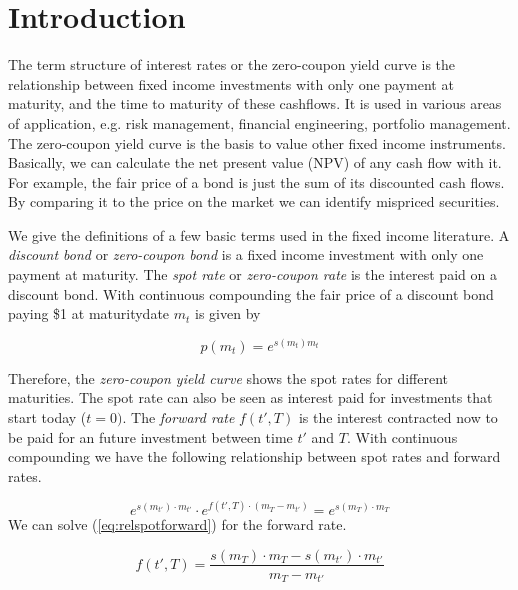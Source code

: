 \newpage
\section{Introduction}


The term structure of interest rates or the zero-coupon yield curve is the relationship between fixed income investments with only one payment at maturity, and the time to maturity of these cashflows. It is used in various areas of application, e.g. risk management, financial engineering, portfolio management. The zero-coupon yield curve is the basis to value other fixed income instruments. Basically, we can calculate the net present value (NPV) of any cash flow with it. For example, the fair price of a bond is just the sum of its discounted cash flows. By comparing it to the price on the market we can identify mispriced securities.

We give the definitions of a few basic terms used in the fixed income literature. A \emph{discount bond} or \emph{zero-coupon bond} is a fixed income investment with only one payment at maturity. The \emph{spot rate} or \emph{zero-coupon rate} is the interest paid on a discount bond. With continuous compounding the fair price of a discount bond paying \$1 at maturitydate  $m_t$ is given by

\begin{equation}
  \label{eq:pricediscountbond}
  p(m_t)=e^{s(m_t)m_t}
\end{equation}

Therefore, the \emph{zero-coupon yield curve} shows the spot rates for different maturities. The spot rate can also be seen as interest paid for investments that start today ($t=0)$. The \emph{forward rate} $f(t',T)$ is the interest contracted now to be paid for an future investment between time $t'$ and $T$. With continuous compounding we have the following relationship between spot rates and forward rates.

\begin{equation}
  \label{eq:relspotforward}
  e^{s(m_{t'})\cdot m_{t'}}\cdot e^{f(t',T)\cdot (m_T-m_{t'})} = e^{s(m_T)\cdot m_T}
\end{equation}
We can solve (\ref{eq:relspotforward}) for the forward rate.

\begin{equation}
  \label{eq:forwardrate}
  f(t',T) = \frac{s(m_T)\cdot m_T - s(m_{t'})\cdot m_{t'}}{m_T-m_{t'}}
\end{equation}

